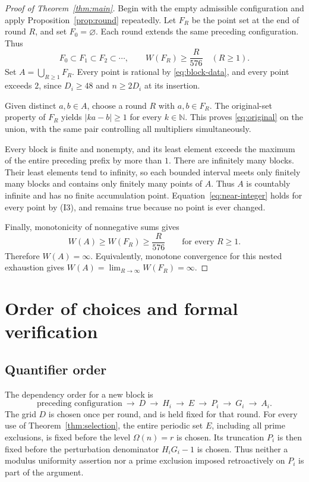 \documentclass[11pt,reqno]{amsart}
\theoremstyle{definition}
\theoremstyle{remark}
\numberwithin{equation}{section}
\newcommand{\N}{\mathbb N}
\newcommand{\Om}{\Omega}
\begin{document}
\begin{proof}[Proof of Theorem~\ref{thm:main}]
Begin with the empty admissible configuration and apply
Proposition~\ref{prop:round} repeatedly. Let $F_R$ be the point set at the
end of round $R$, and set $F_0=\varnothing$. Each round extends the same
preceding configuration. Thus
\[
 F_0\subset F_1\subset F_2\subset\cdots,
 \qquad W(F_R)\geq\frac R{576}\quad(R\geq1).
\]
Set $A=\bigcup_{R\geq1}F_R$. Every point is rational by
\eqref{eq:block-data}, and every point exceeds $2$, since
$D_i\geq48$ and $n\geq2D_i$ at its insertion.

Given distinct $a,b\in A$, choose a round $R$ with $a,b\in F_R$.
The original-set property of $F_R$ yields $|ka-b|\geq1$ for every
$k\in\N$. This proves \eqref{eq:original} on the union, with the same
pair controlling all multipliers simultaneously.

Every block is finite and nonempty, and its least element exceeds the
maximum of the entire preceding prefix by more than $1$. There are
infinitely many blocks. Their least elements tend to infinity, so each
bounded interval meets only finitely many blocks and contains only
finitely many points of $A$. Thus $A$ is countably infinite and has no
finite accumulation point. Equation~\eqref{eq:near-integer} holds for
every point by (I3), and remains true because no point is ever changed.

Finally, monotonicity of nonnegative sums gives
\[
 W(A)\geq W(F_R)\geq\frac R{576}\qquad\text{for every }R\geq1.
\]
Therefore $W(A)=\infty$. Equivalently, monotone convergence for this
nested exhaustion gives $W(A)=\lim_{R\to\infty}W(F_R)=\infty$.
\end{proof}

\section{Order of choices and formal verification}
\label{sec:status}

\subsection{Quantifier order}
The dependency order for a new block is
\[
 \text{preceding configuration}
 \ \longrightarrow\ D\ \longrightarrow\ H_i\ \longrightarrow\ E
 \ \longrightarrow\ P_i\ \longrightarrow\ G_i\ \longrightarrow\ A_i.
\]
The grid $D$ is chosen once per round, and is held fixed for that round.
For every use of Theorem~\ref{thm:selection}, the entire periodic set
$E$, including all prime exclusions, is fixed before the level
$\Om(n)=r$ is chosen. Its truncation $P_i$ is then fixed before the
perturbation denominator $H_iG_i-1$ is chosen. Thus neither a modulus
uniformity assertion nor a prime exclusion imposed retroactively on
$P_i$ is part of the argument.
\end{document}

